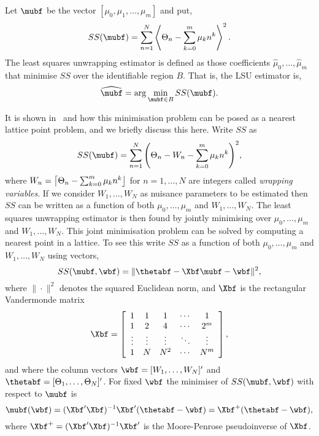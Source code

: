 \documentclass[journal]{IEEEtran}
\begin{document}
Let $\mubf$ be the vector $[\mu_0, \mu_1, \dots, \mu_m]$ and put,
\begin{equation} \label{eq:sumofsquaresfunction}
SS(\mubf) = \sum_{n=1}^{N}\fracpart{  \Theta_{n} - \sum_{k = 0}^{m}{\mu_k n^k} }^{2}.
\end{equation}
The least squares unwrapping estimator is defined as those coefficients $\widehat{\mu}_0, \dots, \widehat{\mu}_m$ that minimise $SS$ over the identifiable region $B$. That is, the LSU estimator is,
\begin{equation}\label{eq:hatmubfLSUdefn}
\widehat{\mubf} = \arg \min_{\mubf \in B} SS(\mubf). 
\end{equation}

It is shown in~\cite{McKilliam2009asilomar_polyest_lattice} and \cite[Sec~8.1]{McKilliam2010thesis} how this minimisation problem can be posed as a nearest lattice point problem, and we briefly discuss this here.  Write $SS$ as
\[
SS(\mubf) = \sum_{n=1}^{N}{ \left( \Theta_{n} - W_n - \sum_{k = 0}^{m}{\mu_k n^k} \right)^2 },
\]
where $W_n = {\left\lceil \Theta_{n} - \sum_{k = 0}^{m}{\mu_k n^k}  \right\rfloor}$ for $n = 1, \dots, N$ are integers called \emph{wrapping variables}.  If we consider $W_1,\dots,W_N$ as nuisance parameters to be estimated then $SS$ can be written as a function of both $\mu_0,\dots,\mu_m$ and $W_1,\dots,W_N$.  The least squares unwrapping estimator is then found by jointly minimising over $\mu_0,\dots,\mu_m$ and $W_1,\dots,W_N$.   This joint minimisation problem can be solved by computing a nearest point in a lattice.  To see this write $SS$ as a function of both $\mu_0,\dots,\mu_m$ and $W_1,\dots,W_N$ using vectors,
\begin{equation}\label{eq:SS_in_vector_form_with_u_nuisance}
SS(\mubf, \wbf) = \| \thetabf - \Xbf\mubf - \wbf \|^2,
\end{equation}
where $\|\cdot\|^2$ denotes the squared Euclidean norm, and $\Xbf$ is the rectangular Vandermonde matrix
\begin{equation}\label{eq:Xvandermonde}
\Xbf = \left[ \begin{array}{ccccc} 
1 & 1 & 1 & \cdots & 1 \\
1 & 2 & 4 & \cdots & 2^m \\
\vdots & \vdots  & \vdots & \ddots & \vdots \\
1 & N & N^2 & \cdots & N^m \\
\end{array} \right],
\end{equation}
and where the column vectors $\wbf = [W_1, \dots, W_N]^\prime$ and $\thetabf = [\Theta_1, \dots, \Theta_N]^\prime$.   For fixed $\wbf$ the minimiser of $SS(\mubf, \wbf)$ with respect to $\mubf$ is
\begin{equation} \label{eq:hat_theta_cal}
\mubf(\wbf) = (\Xbf^\prime\Xbf)^{-1}\Xbf^\prime( \thetabf - \wbf) = \Xbf^+( \thetabf - \wbf),
\end{equation}
where $\Xbf^+ = (\Xbf^\prime\Xbf)^{-1}\Xbf^\prime$ is the Moore-Penrose pseudoinverse of $\Xbf$.
\end{document}
